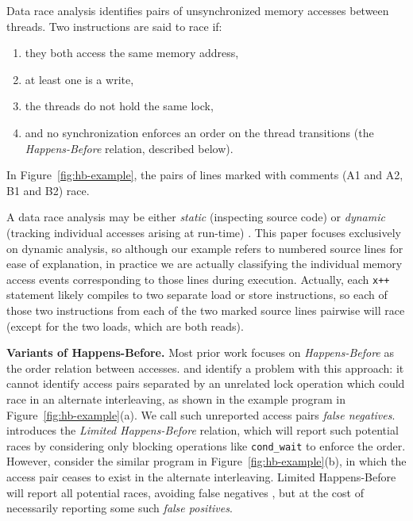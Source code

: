 Data race analysis \cite{eraser} identifies pairs of unsynchronized memory accesses between threads.
Two instructions are said to race if:
\begin{enumerate}
	\item they both access the same memory address,
	\item at least one is a write,
	\item the threads do not hold the same lock,
	\item and no synchronization enforces an order on the thread transitions (the {\em Happens-Before} relation, described below).
\end{enumerate}
In Figure~\ref{fig:hb-example}, the pairs of lines marked with comments (A1 and A2, B1 and B2) race.

A data race analysis may be either {\em static} (inspecting source code) \cite{racerx} or {\em dynamic} (tracking individual accesses arising at run-time) \cite{tsan}.
This paper focuses exclusively on dynamic analysis,
so although our example refers to numbered source lines for ease of explanation,
in practice we are actually classifying the individual memory access events corresponding to those lines during execution.
Actually, each {\tt x++} statement likely compiles to two separate load or store instructions, so each of those two instructions from each of the two marked source lines pairwise will race (except for the two loads, which are both reads).

{\bf Variants of Happens-Before.}
        Most prior work focuses on {\em Happens-Before} \cite{lamport-clocks} as the order relation between accesses.
\cite{predictive-dr} and \cite{hybriddatarace} identify a problem with this approach:
it cannot identify access pairs separated by an unrelated lock operation which could race in an alternate interleaving,
as shown in the example program in Figure~\ref{fig:hb-example}(a).
We call such unreported access pairs {\em false negatives}.
\cite{hybriddatarace} introduces the {\em Limited Happens-Before} relation,
which will report such potential races
by considering only blocking operations like {\tt cond\_wait} to enforce the order.
However, consider the similar program in Figure~\ref{fig:hb-example}(b),
in which the access pair ceases to exist in the alternate interleaving.
Limited Happens-Before will report all potential races, avoiding false negatives \cite{tsan},
but at the cost of necessarily reporting some such {\em false positives}.

